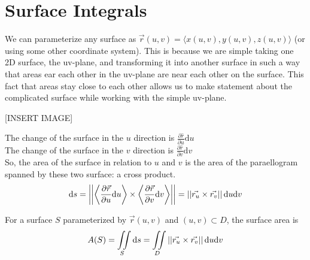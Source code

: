 \section{Surface Integrals}
\noindent
We can parameterize any surface as $\vec{r}(u,v)=\langle x(u,v), y(u,v), z(u,v)\rangle$ (or using some other coordinate system). This is because we are simple taking one 2D surface, the uv-plane, and transforming it into another surface in such a way that areas ear each other in the uv-plane are near each other on the surface. This fact that areas stay close to each other allows us to make statement about the complicated surface while working with the simple uv-plane.

[INSERT IMAGE]

\noindent
The change of the surface in the $u$ direction is $\frac{\partial\hat{r}}{\partial u}\mathrm{d}u$\\
The change of the surface in the $v$ direction is $\frac{\partial\hat{r}}{\partial v}\mathrm{d}v$\\
So, the area of the surface in relation to $u$ and $v$ is the area of the paraellogram spanned by these two surface: a cross product.\\
$$\mathrm{d}s=\left|\left|\left<\frac{\partial\vec{r}}{\partial u}\mathrm{d}u\right>\times\left<\frac{\partial\vec{r}}{\partial v}\mathrm{d}v\right>\right|\right|=\left|\left|\vec{r_u}\times\vec{r_v}\right|\right|\mathrm{d}u\mathrm{d}v$$

\begin{definition}
	For a surface $S$ parameterized by $\vec{r}(u,v)$ and $(u,v)\subset D$, the surface area is\\
	$$A(S)=\iint\limits_{S}{\mathrm{d}s}=\iint\limits_{D}{\left|\left|\vec{r_u}\times\vec{r_v}\right|\right|\mathrm{d}u\mathrm{d}v}$$
\end{definition}


